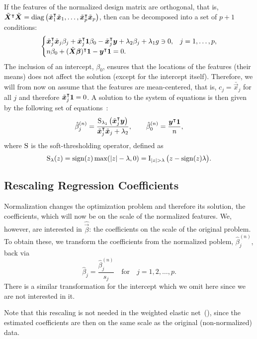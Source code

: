 If the features of the normalized design matrix are orthogonal, that is,
\(\tilde{\boldsymbol{X}}^\intercal \tilde{\boldsymbol{X}} = \operatorname{diag}\left(\tilde{\boldsymbol{x}}_1^\intercal
\tilde{\boldsymbol{x}}_1, \dots, \tilde{\boldsymbol{x}}_p^\intercal \tilde{\boldsymbol{x}}_p\right) \), then
 can be decomposed into a set of \(p + 1\) conditions:
\[
  \begin{cases}
    \tilde{\boldsymbol{x}}_j^\intercal \tilde{\boldsymbol{x}}_j \beta_j + \tilde{\boldsymbol{x}}_j^\intercal \boldsymbol{1} \beta_0 - \tilde{\boldsymbol{x}}_j^\intercal\boldsymbol{y} + \lambda_2 \beta_j + \lambda_1 g \ni 0, & j=1,\dots,p, \\
    n \beta_0 + (\tilde{\boldsymbol{X}}\boldsymbol{\beta})^\intercal \boldsymbol{1} -  \boldsymbol{y}^\intercal \boldsymbol{1} = 0.
  \end{cases}
\]
The inclusion of an intercept, \(\beta_0\), ensures that the locations of the features
(their means) does not affect the solution (except for the intercept itself). Therefore, we
will from now on assume that the features are mean-centered, that is, \(c_j =
\bar{\vec{x}}_j\) for all \(j\) and therefore \(\tilde{\boldsymbol{x}}_j^\intercal \boldsymbol{1} = 0\). A
solution to the system of equations is then given by the following set of
equations~\citep{donoho1994}:
\begin{equation*}
  \label{eq:orthogonal-solution-normalized}
  \hat{\beta}^{(n)}_j = \frac{\operatorname{S}_{\lambda_1}\left(\tilde{\boldsymbol{x}}_j^\intercal \boldsymbol{y}\right)}{\tilde{\boldsymbol{x}}_j^\intercal \tilde{\boldsymbol{x}}_j + \lambda_2},
  \qquad
  \hat{\beta}_0^{(n)} = \frac{\boldsymbol{y}^\intercal \boldsymbol{1}}{n},
\end{equation*}
where \(\operatorname{S}\) is the soft-thresholding operator, defined as
\[
  \st_\lambda(z) = \sign(z) \max(|z| - \lambda, 0) = \ind{|z|>\lambda}\big(z - \sign(z)\lambda\big).
\]

\subsection{Rescaling Regression Coefficients}

Normalization changes the optimization problem and therefore its solution, the
coefficients, which will now be on the scale of the normalized features. We, however, are
interested in \(\hat{\vec{\beta}}\): the coefficients on the scale of the original problem.
To obtain these, we transform the coefficients from the normalized poblem,
\(\hat\beta^{(n)}_j\), back via
\begin{equation}
  \label{eq:orthogonal-solution}
  \hat\beta_j = \frac{\hat\beta^{(n)}_j}{s_j} \quad\text{for}\quad j = 1,2,\dots,p.
\end{equation}
There is a similar transformation for the intercept which we omit here since we are not interested in it.

Note that this rescaling is not needed in the weighted elastic
net~(), since the estimated coefficients are then on the same
scale as the original (non-normalized) data.
